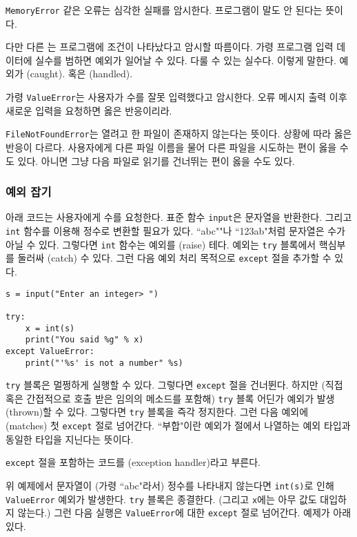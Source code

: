 \documentclass[a4paper]{oblivoir}
\begin{document}
\texttt{MemoryError} 같은 오류는 심각한 실패를 암시한다. 프로그램이 말도 안 된다는 뜻이다.

다만 다른 는 프로그램에  조건이 나타났다고 암시할 따름이다. 가령 프로그램 입력 데이터에 실수를 범하면 예외가 일어날 수 있다. 다룰 수 있는 실수다. 이렇게 말한다. 예외가 (caught). 혹은 (handled).

가령 \texttt{ValueError}는 사용자가 수를 잘못 입력했다고 암시한다. 오류 메시지 출력 이후 새로운 입력을 요청하면 옳은 반응이리라.

\texttt{FileNotFoundError}는 열려고 한 파일이 존재하지 않는다는 뜻이다. 상황에 따라 옳은 반응이 다르다. 사용자에게 다른 파일 이름을 물어 다른 파일을 시도하는 편이 옳을 수도 있다. 아니면 그냥 다음 파일로 읽기를 건너뛰는 편이 옳을 수도 있다.

\subsubsection*{예외 잡기}

아래 코드는 사용자에게 수를 요청한다. 표준 함수 \texttt{input}은 문자열을 반환한다. 그리고 \texttt{int} 함수를 이용해 정수로 변환할 필요가 있다. ``abc""나 ``123ab"처럼 문자열은 수가 아닐 수 있다. 그렇다면 \texttt{int} 함수는 예외를 (raise) 테다. 예외는 \texttt{try} 블록에서 핵심부를 둘러싸 (catch) 수 있다. 그런 다음 예외 처리 목적으로 \texttt{except} 절을 추가할 수 있다. 

\begin{verbatim}
s = input("Enter an integer> ")

try:
    x = int(s)
    print("You said %g" % x)
except ValueError:
    print("'%s' is not a number" %s)
\end{verbatim}

\texttt{try} 블록은 멀쩡하게 실행할 수 있다. 그렇다면 \texttt{except} 절을 건너뛴다. 하지만 (직접 혹은 간접적으로 호출 받은 임의의 메소드를 포함해) \texttt{try} 블록 어딘가 예외가 발생(thrown)할 수 있다. 그렇다면 \texttt{try} 블록을 즉각 정지한다. 그런 다음 예외에 (matches) 첫 \texttt{except} 절로 넘어간다. ``부합"이란 예외가 절에서 나열하는 예외 타입과 동일한 타입을 지닌다는 뜻이다.

\texttt{except} 절을 포함하는 코드를 (exception handler)라고 부른다.

위 예제에서 문자열이 (가령 ``abc"라서) 정수를 나타내지 않는다면 \texttt{int(s)}로 인해 \texttt{ValueError} 예외가 발생한다. \texttt{try} 블록은 종결한다. (그리고 \texttt{x}에는 아무 값도 대입하지 않는다.) 그런 다음 실행은 \texttt{ValueError}에 대한 \texttt{except} 절로 넘어간다. 예제가 아래 있다.
\end{document}
